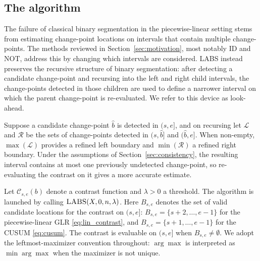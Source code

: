 \documentclass[12pt, a4paper]{article}
\begin{document}
\subsection{The algorithm}
\label{sec:labs_algorithm}

The failure of classical binary segmentation in the piecewise-linear setting stems from estimating change-point locations on intervals that contain multiple change-points. The methods reviewed in Section~\ref{sec:motivation}, most notably ID and NOT, address this by changing which intervals are considered. LABS instead preserves the recursive structure of binary segmentation: after detecting a candidate change-point and recursing into the left and right child intervals, the change-points detected in those children are used to define a narrower interval on which the parent change-point is re-evaluated. We refer to this device as look-ahead.

Suppose a candidate change-point $\hat{b}$ is detected in $(s, e]$, and on recursing let $\mathcal{L}$ and $\mathcal{R}$ be the sets of change-points detected in $(s, \hat{b}]$ and $(\hat{b}, e]$. When non-empty, $\max(\mathcal{L})$ provides a refined left boundary and $\min(\mathcal{R})$ a refined right boundary. Under the assumptions of Section~\ref{sec:consistency}, the resulting interval contains at most one previously undetected change-point, so re-evaluating the contrast on it gives a more accurate estimate.

Let $\mathcal{C}_{s,e}(b)$ denote a contrast function and $\lambda > 0$ a threshold. The algorithm is launched by calling $\textsc{LABS}(X, 0, n, \lambda)$. Here $B_{s,e}$ denotes the set of valid candidate locations for the contrast on $(s,e]$: $B_{s,e} = \{s+2, \ldots, e-1\}$ for the piecewise-linear GLR \eqref{eq:lin_contrast}, and $B_{s,e} = \{s+1, \ldots, e-1\}$ for the CUSUM \eqref{eq:cusum}. The contrast is evaluable on $(s,e]$ when $B_{s,e} \neq \emptyset$. We adopt the leftmost-maximizer convention throughout: $\arg\max$ is interpreted as $\min \arg\max$ when the maximizer is not unique.
\end{document}
